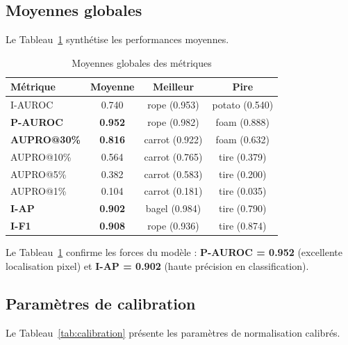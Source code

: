 \documentclass[12pt,a4paper,oneside]{report}
\begin{document}
\subsection{Moyennes globales}

Le Tableau~\ref{tab:moyennes} synthétise les performances moyennes.

\begin{table}[H]
\centering
\caption{Moyennes globales des métriques}
\label{tab:moyennes}
\begin{tabularx}{\textwidth}{X c c c}
\toprule
\textbf{Métrique} & \textbf{Moyenne} & \textbf{Meilleur} & \textbf{Pire} \\
\midrule
\rowcolor{tableheader} I-AUROC & 0.740 & rope (0.953) & potato (0.540) \\
\textbf{P-AUROC} & \textbf{0.952} & rope (0.982) & foam (0.888) \\
\rowcolor{tableheader} \textbf{AUPRO@30\%} & \textbf{0.816} & carrot (0.922) & foam (0.632) \\
AUPRO@10\% & 0.564 & carrot (0.765) & tire (0.379) \\
\rowcolor{tableheader} AUPRO@5\% & 0.382 & carrot (0.583) & tire (0.200) \\
AUPRO@1\% & 0.104 & carrot (0.181) & tire (0.035) \\
\rowcolor{tableheader} \textbf{I-AP} & \textbf{0.902} & bagel (0.984) & tire (0.790) \\
\textbf{I-F1} & \textbf{0.908} & rope (0.936) & tire (0.874) \\
\bottomrule
\end{tabularx}
\end{table}

Le Tableau~\ref{tab:moyennes} confirme les forces du modèle : \textbf{P-AUROC = 0.952} (excellente localisation pixel) et \textbf{I-AP = 0.902} (haute précision en classification).

\subsection{Paramètres de calibration}

Le Tableau~\ref{tab:calibration} présente les paramètres de normalisation calibrés.
\end{document}
